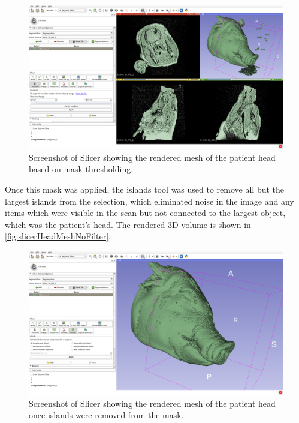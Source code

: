\documentclass[12pt]{report}
\begin{document}
\begin{figure}[thpb]
	\centering
	\includegraphics[width=\textwidth]{images/segmentation_threshold.png}
    \caption{Screenshot of Slicer showing the rendered mesh of the patient head based on mask thresholding.}
    \label{fig:segmentationThreshold}
\end{figure}

Once this mask was applied, the islands tool was used to remove all but the largest islands from the selection, which eliminated noise in the image and any items which were visible in the scan but not connected to the largest object, which was the patient's head. The rendered 3D volume is shown in \autoref{fig:slicerHeadMeshNoFilter}.

\begin{figure}[thpb]
	\centering
	\includegraphics[width=\textwidth]{images/segmentation_islands.png}
    \caption{Screenshot of Slicer showing the rendered mesh of the patient head once islands were removed from the mask.}
    \label{fig:slicerHeadMeshNoFilter}
\end{figure}
\end{document}
